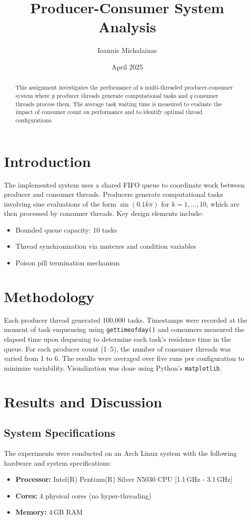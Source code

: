 \documentclass{article}
\title{Producer-Consumer System Analysis}
\author{Ioannis Michalainas}
\date{April 2025}
\begin{document}
\maketitle

\begin{abstract}
This assignment investigates the performance of a multi-threaded producer-consumer system where \textit{p} producer threads generate computational tasks and \textit{q} consumer threads process them. The average task waiting time is measured to evaluate the impact of consumer count on performance and to identify optimal thread configurations.
\end{abstract}

\section{Introduction}
The implemented system uses a shared FIFO queue to coordinate work between producer and consumer threads. Producers generate computational tasks involving sine evaluations of the form $\sin(0.1k\pi)$ for $k = 1,\ldots,10$, which are then processed by consumer threads. Key design elements include:
\begin{itemize}
    \item Bounded queue capacity: 10 tasks
    \item Thread synchronization via mutexes and condition variables
    \item Poison pill termination mechanism
\end{itemize}

\section{Methodology}
Each producer thread generated 100{,}000 tasks. Timestamps were recorded at the moment of task enqueueing using \texttt{gettimeofday()} and consumers measured the elapsed time upon dequeuing to determine each task’s residence time in the queue. For each producer count (1--5), the number of consumer threads was varied from 1 to 6. The results were averaged over five runs per configuration to minimize variability. Visualization was done using Python's \texttt{matplotlib}.

\section{Results and Discussion}

\subsection{System Specifications}
The experiments were conducted on an Arch Linux system with the following hardware and system specifications:
\begin{itemize}
    \item \textbf{Processor:} Intel(R) Pentium(R) Silver N5030 CPU [1.1\,GHz - 3.1\,GHz]
    \item \textbf{Cores:} 4 physical cores (no hyper-threading)
    \item \textbf{Memory:} 4\,GB RAM
\end{itemize}
\end{document}
